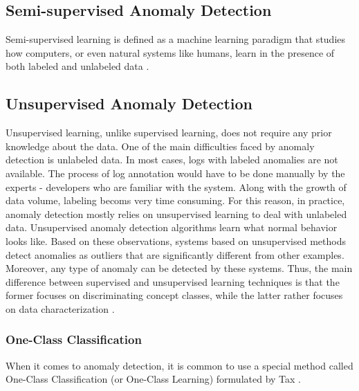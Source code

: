 \subsection{Semi-supervised Anomaly Detection} %
Semi-supervised learning is defined as a machine learning paradigm that studies how computers, or even natural systems like humans, learn in the presence of both labeled and unlabeled data \cite{zhu2009introduction}.

 
\subsection{Unsupervised Anomaly Detection}
Unsupervised learning, unlike supervised learning, does not require any prior knowledge about the data. One of the main difficulties faced by anomaly detection is unlabeled data. In most cases, logs with labeled anomalies are not available. The process of log annotation would have to be done manually by the experts - developers who are familiar with the system. Along with the growth of data volume, labeling becoms very time consuming. For this reason, in practice, anomaly detection mostly relies on unsupervised learning to deal with unlabeled data. Unsupervised anomaly detection algorithms learn what normal behavior looks like. Based on these observations, systems based on unsupervised methods detect anomalies as outliers that are significantly different from other examples. Moreover, any type of anomaly can be detected by these systems. Thus, the main difference between supervised and unsupervised learning techniques is that the former focuses on discriminating concept classes, while the latter rather focuses on data characterization \cite{Goernitz_2013}. %
 
\subsubsection*{One-Class Classification}
When it comes to anomaly detection, it is common to use a special method called One-Class Classification (or One-Class Learning) formulated by Tax \cite{tax2002occ}. 
 
